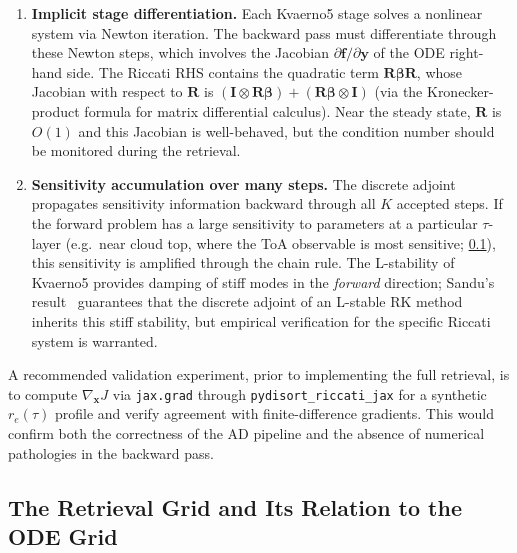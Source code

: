 \documentclass[11pt,a4paper]{article}
\newcommand{\vect}[1]{\bm{#1}}
\newcommand{\mat}[1]{\mathbf{#1}}
\theoremstyle{definition}
\begin{document}
\begin{enumerate}
  \item \textbf{Implicit stage differentiation.}  Each Kvaerno5 stage
    solves a nonlinear system via Newton iteration.  The backward pass
    must differentiate through these Newton steps, which involves the
    Jacobian $\partial\vect{f}/\partial\vect{y}$ of the ODE
    right-hand side.  The Riccati RHS contains the quadratic term
    $\mat{R}\mat{\beta}\mat{R}$, whose Jacobian with respect to
    $\mat{R}$ is $(\mat{I} \otimes \mat{R}\mat{\beta}) +
    (\mat{R}\mat{\beta} \otimes \mat{I})$ (via the Kronecker-product
    formula for matrix differential calculus).  Near the steady state,
    $\mat{R}$ is $O(1)$ and this Jacobian is well-behaved, but the
    condition number should be monitored during the retrieval.

  \item \textbf{Sensitivity accumulation over many steps.}  The discrete
    adjoint propagates sensitivity information backward through all
    $K$ accepted steps.  If the forward problem has a large sensitivity
    to parameters at a particular $\tau$-layer (e.g.\ near cloud top,
    where the ToA observable is most sensitive; \cref{sec:retrieval-grid}),
    this sensitivity is amplified
    through the chain rule.  The L-stability of Kvaerno5 provides
    damping of stiff modes in the \emph{forward} direction; Sandu's
    result~\cite{sandu2006} guarantees that the discrete adjoint of an
    L-stable RK method inherits this stiff stability, but empirical
    verification for the specific Riccati system is warranted.
\end{enumerate}

A recommended validation experiment, prior to implementing the full
retrieval, is to compute $\nabla_{\!\vect{x}} J$ via
\texttt{jax.grad} through \texttt{pydisort\_riccati\_jax} for a
synthetic $r_e(\tau)$ profile and verify agreement with finite-difference
gradients.  This would confirm both the correctness of the AD pipeline
and the absence of numerical pathologies in the backward pass.

\subsection{The Retrieval Grid and Its Relation to the ODE Grid}\label{sec:retrieval-grid}
\end{document}
